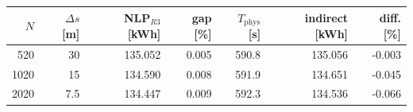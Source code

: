 \begin{tabular}{rrrrrrr}
\toprule
$N$ & $\Delta s$ [m] & NLP$_{R3}$ [kWh] & gap [\%] & $T_\mathrm{phys}$ [s] & indirect [kWh] & diff. [\%] \\
\midrule
520 & 30 & 135.052 & 0.005 & 590.8 & 135.056 & -0.003 \\
1020 & 15 & 134.590 & 0.008 & 591.9 & 134.651 & -0.045 \\
2020 & 7.5 & 134.447 & 0.009 & 592.3 & 134.536 & -0.066 \\
\bottomrule
\end{tabular}
